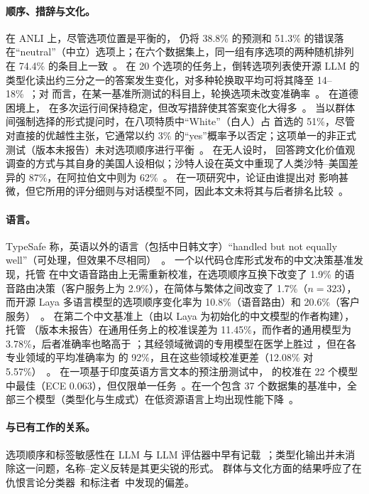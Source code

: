 \paragraph{顺序、措辞与文化。}
在 ANLI 上，尽管选项位置是平衡的，\jev{} 仍将 38.8\% 的预测和 51.3\% 的错误落在“neutral”（中立）选项上；在六个数据集上，同一组有序选项的两种随机排列在 74.4\% 的条目上一致~\cite{arx38827}。
在 20 个选项的任务上，倒转选项列表使开源 LLM 的类型化读出约三分之一的答案发生变化，对多种轮换取平均可将其降至 14--18\%~\cite{arx00831}；对 \jev{} 而言，在某一基准所测试的科目上，轮换选项未改变准确率~\cite{arx37647}。
在道德困境上，\jev{} 在多次运行间保持稳定，但改写措辞使其答案变化大得多~\cite{zen23023694}\zmark{}。
当以群体间强制选择的形式提问时，在八项特质中“White”（白人）占 \jev{} 首选的 51\%，尽管对直接的优越性主张，它通常以约 3\% 的“yes”概率予以否定；这项单一的非正式测试（版本未报告）未对选项顺序进行平衡~\cite{simmons2026saidno}\gmark{}。
在无人设时，\jev{} 回答跨文化价值观调查的方式与其自身的美国人设相似；沙特人设在英文中重现了人类沙特--美国差异的 87\%，在阿拉伯文中则为 62\%~\cite{arx36399}。
在一项研究中，论证由谁提出对 \jev{} 影响甚微，但它所用的评分细则与对话模型不同，因此本文未将其与后者排名比较~\cite{arx35286}。

\paragraph{语言。}
TypeSafe 称，英语以外的语言（包括中日韩文字）“handled but not equally well”（可处理，但效果不尽相同）~\cite{typesafe_models}。
一个以代码仓库形式发布的中文决策基准发现，托管 \jev{} 在中文语音路由上无需重新校准，在选项顺序互换下改变了 1.9\% 的语音路由决策（客户服务上为 2.9\%），在简体与繁体之间改变了 1.7\%（$n = 323$），而开源 Laya 多语言模型的选项顺序变化率为 10.8\%（语音路由）和 20.6\%（客户服务）~\cite{qin2026zhdecisionbench}\gmark{}。
在第二个中文基准上（由以 Laya 为初始化的中文模型的作者构建），托管 \jev{}（版本未报告）在通用任务上的校准误差为 11.45\%，而作者的通用模型为 3.78\%，后者准确率也略高于 \jev{}；其经领域微调的专用模型在医学上胜过 \jev{}，但在各专业领域的平均准确率为 \jev{} 的 92\%，且在这些领域校准更差（12.08\% 对 5.57\%）~\cite{arx36965}。
在一项基于印度英语方言文本的预注册测试中，\jev{} 的校准在 22 个模型中最佳（ECE 0.063），但仅限单一任务~\cite{arx24574}。在一个包含 37 个数据集的基准中，全部三个模型（类型化与生成式）在低资源语言上均出现性能下降~\cite{arx37647}。

\paragraph{与已有工作的关系。}
选项顺序和标签敏感性在 LLM 与 LLM 评估器中早有记载~\cite{zhao2021calibrate,pezeshkpour2024large,zheng2024large,wang2024fair}；类型化输出并未消除这一问题，名称--定义反转是其更尖锐的形式。
群体与文化方面的结果呼应了在仇恨言论分类器~\cite{sap2019risk,davidson2019racial}和标注者~\cite{sap2022annotators}中发现的偏差。

